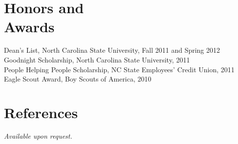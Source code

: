 \documentclass[margin,line,letterpaper]{resume}
\begin{document}
\begin{resume}
    \section{\mysidestyle Honors and\\Awards} 

    Dean's List, North Carolina State University, Fall 2011 and Spring 2012   \vspace{-8mm}\\%

    Goodnight Scholarship, North Carolina State University, 2011              \vspace{-8mm}\\%

    People Helping People Scholarship, NC State Employees' Credit Union, 2011 \vspace{-8mm}\\%

    Eagle Scout Award, Boy Scouts of America, 2010

    \section{\mysidestyle References} 
    {\sl Available upon request.}




\end{resume}
\end{document}
